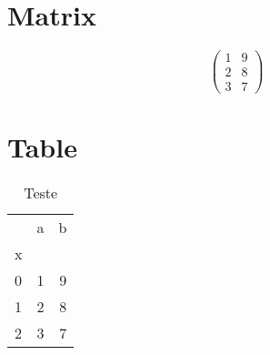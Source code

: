 \documentclass{article}%
\begin{document}
%
\normalsize%
\section{Matrix}%
\label{sec:Matrix}%
\[%
\begin{pmatrix}%
1&9\\%
2&8\\%
3&7%
\end{pmatrix}%
\]

%
\section{Table}%
\label{sec:Table}%


\begin{table}[htbp]%
\caption{Teste}%
\centering%
\begin{tabular}{lrr}
\toprule
 & a & b \\
x &  &  \\
\midrule
0 & 1 & 9 \\
1 & 2 & 8 \\
2 & 3 & 7 \\
\bottomrule
\end{tabular}
%
\end{table}

%
\end{document}
